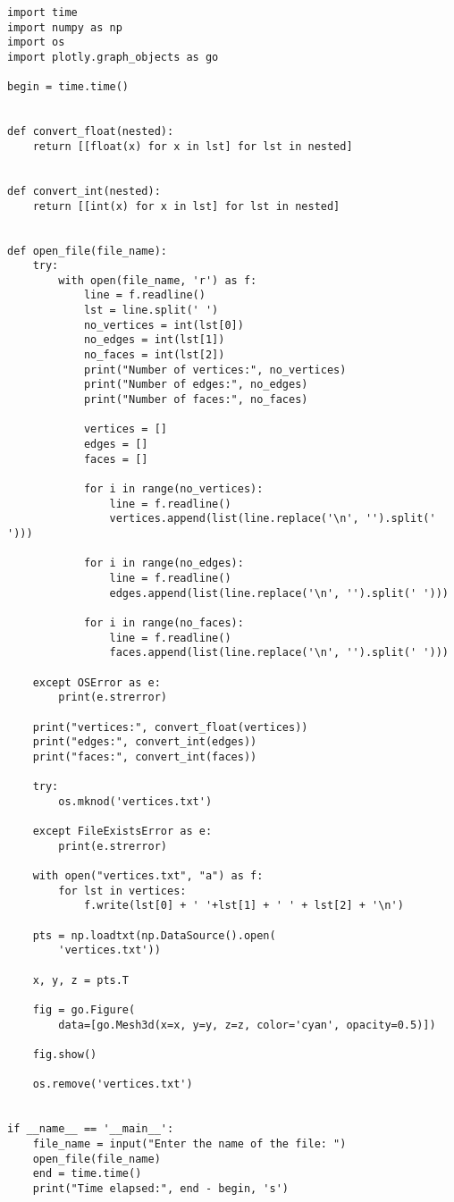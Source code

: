 \documentclass[11pt]{article}
\begin{document}
\begin{verbatim}
import time
import numpy as np
import os
import plotly.graph_objects as go

begin = time.time()


def convert_float(nested):
    return [[float(x) for x in lst] for lst in nested]


def convert_int(nested):
    return [[int(x) for x in lst] for lst in nested]


def open_file(file_name):
    try:
        with open(file_name, 'r') as f:
            line = f.readline()
            lst = line.split(' ')
            no_vertices = int(lst[0])
            no_edges = int(lst[1])
            no_faces = int(lst[2])
            print("Number of vertices:", no_vertices)
            print("Number of edges:", no_edges)
            print("Number of faces:", no_faces)

            vertices = []
            edges = []
            faces = []

            for i in range(no_vertices):
                line = f.readline()
                vertices.append(list(line.replace('\n', '').split(' ')))

            for i in range(no_edges):
                line = f.readline()
                edges.append(list(line.replace('\n', '').split(' ')))

            for i in range(no_faces):
                line = f.readline()
                faces.append(list(line.replace('\n', '').split(' ')))

    except OSError as e:
        print(e.strerror)

    print("vertices:", convert_float(vertices))
    print("edges:", convert_int(edges))
    print("faces:", convert_int(faces))

    try:
        os.mknod('vertices.txt')

    except FileExistsError as e:
        print(e.strerror)

    with open("vertices.txt", "a") as f:
        for lst in vertices:
            f.write(lst[0] + ' '+lst[1] + ' ' + lst[2] + '\n')

    pts = np.loadtxt(np.DataSource().open(
        'vertices.txt'))

    x, y, z = pts.T

    fig = go.Figure(
        data=[go.Mesh3d(x=x, y=y, z=z, color='cyan', opacity=0.5)])

    fig.show()

    os.remove('vertices.txt')


if __name__ == '__main__':
    file_name = input("Enter the name of the file: ")
    open_file(file_name)
    end = time.time()
    print("Time elapsed:", end - begin, 's')

\end{verbatim}
\end{document}
